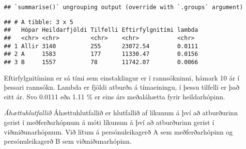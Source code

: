 \documentclass[
]{book}
\newenvironment{Shaded}{\begin{snugshade}}{\end{snugshade}}
\newcommand{\CommentTok}[1]{\textcolor[rgb]{0.56,0.35,0.01}{\textit{#1}}}
\newcommand{\DataTypeTok}[1]{\textcolor[rgb]{0.13,0.29,0.53}{#1}}
\newcommand{\DecValTok}[1]{\textcolor[rgb]{0.00,0.00,0.81}{#1}}
\newcommand{\KeywordTok}[1]{\textcolor[rgb]{0.13,0.29,0.53}{\textbf{#1}}}
\newcommand{\NormalTok}[1]{#1}
\newcommand{\OperatorTok}[1]{\textcolor[rgb]{0.81,0.36,0.00}{\textbf{#1}}}
\newcommand{\StringTok}[1]{\textcolor[rgb]{0.31,0.60,0.02}{#1}}
\begin{document}
\begin{verbatim}
## `summarise()` ungrouping output (override with `.groups` argument)
\end{verbatim}

\begin{Shaded}
\end{Shaded}

\begin{verbatim}
## # A tibble: 3 x 5
##   Hópar Heildarfjöldi Tilfelli Eftirfylgnitími lambda
##   <chr> <chr>         <chr>    <chr>           <chr> 
## 1 Allir 3140          255      23072.54        0.0111
## 2 A     1583          177      11330.47        0.0156
## 3 B     1557          78       11742.07        0.0066
\end{verbatim}

Eftirfylgnitíminn er sá tími sem einstaklingur er í rannsókninni, hámark 10 ár í þessari rannsókn. Lambda er fjöldi atburða á tímaeiningu, í þessu tilfelli er það eitt ár. Svo 0.0111 eða 1.11 \% er eins árs meðaláhætta fyrir heildarhópinn.

\emph{Áhættuhlutfallið}
Áhættuhlutfallið er hlutfallið af líkunum á því að atburðurinn gerist í meðferðarhópnum á móti líkunum á því að atburðurinn gerist í viðmiðunarhópnum. Við lítum á persónuleikagerð A sem meðferðarhópinn og persónuleikagerð B sem viðmiðunarhópinn.
\end{document}
